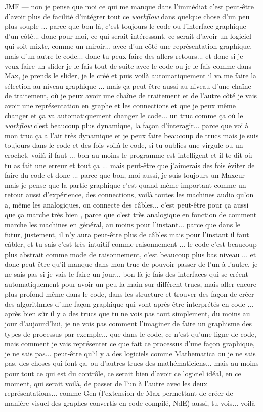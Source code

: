 JMF — non je pense que moi ce qui me manque dans l'immédiat c'est peut-être d'avoir plus de facilité d'intégrer tout ce \textit{workflow} dans quelque chose d'un peu plus souple ... parce que bon là, c'est toujours le code ou l'interface graphique d'un côté... donc pour moi, ce qui serait intéressant, ce serait d'avoir un logiciel qui soit mixte, comme un miroir... avec d'un côté une représentation graphique, mais d'un autre le code... donc tu peux faire des allers-retours... et donc si je veux faire un slider je le fais tout de suite avec le code ou je le fais comme dans Max, je prends le slider, je le créé et puis voilà automatiquement il va me faire la sélection au niveau graphique ... mais ça peut être aussi au niveau d'une chaîne de traitement, où je peux avoir une chaîne de traitement et de l'autre côté je vais avoir une représentation en graphe et les connections et que je peux même changer et ça va automatiquement changer le code... un truc comme ça où le \textit{workflow} c'est beaucoup plus dynamique, la façon d'interagir... parce que voilà mon truc ça a l'air très dynamique et je peux faire beaucoup de trucs mais je suis toujours dans le code et des fois voilà le code, si tu oublies une virgule ou un crochet, voilà il faut ... bon au moins le programme est intelligent et il te dit où tu as fait une erreur et tout ça ... mais peut-être que j'aimerais des fois éviter de faire du code et donc ... parce que bon, moi aussi, je suis toujours un Maxeur mais je pense que la partie graphique c'est quand même important comme un retour aussi d'expérience, des connections, voilà toutes les machines audio qu'on a, même les analogiques, on connecte des câbles... c'est peut-être pour ça aussi que ça marche très bien , parce que c'est très analogique en fonction de comment marche les machines en général, au moins pour l'instant... parce que dans le futur, justement, il n'y aura peut-être plus de câbles mais pour l'instant il faut câbler, et tu sais c'est très intuitif comme raisonnement ... le code c'est beaucoup plus abstrait comme mode de raisonnement, c'est beaucoup plus bas niveau ... et donc peut-être qu'il manque dans mon truc de pouvoir passer de l'un à l'autre, je ne sais pas si je vais le faire un jour... bon là je fais des interfaces qui se créent automatiquement pour avoir un peu la main sur différent trucs, mais aller encore plus profond même dans le code, dans les structure et trouver des façon de créer des algorithmes d'une façon graphique qui vont après être interprétés en code ... après bien sûr il y a des trucs que tu ne vois pas tout simplement, du moins au jour d'aujourd'hui, je ne vois pas comment l'imaginer de faire un graphisme des types de processus par exemple... que dans le code, ce n'est qu'une ligne de code, mais comment je vais représenter ce que fait ce processus d'une façon graphique, je ne sais pas... peut-être qu'il y a des logiciels comme Mathematica ou je ne sais pas, des choses qui font ça, ou d'autres trucs des mathématiciens... mais au moins pour tout ce qui est du contrôle, ce serait bien d'avoir ce logiciel idéal, en ce moment, qui serait voilà, de passer de l'un à l'autre avec les deux représentations... comme Gen (l'extension de Max permettant de créer de manière visuel des graphes convertis en code compilé, NdE) aussi, tu vois... voilà 